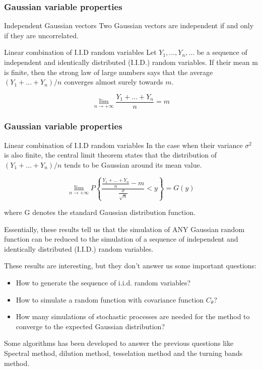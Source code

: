 \documentclass{beamer}
\begin{document}
\begin{frame}
\frametitle{Gaussian variable properties}

\begin{block}{Independent Gaussian vectors}
Two Gaussian vectors are independent if and only if they are uncorrelated.
\end{block}

\begin{block}{Linear combination of I.I.D random variables}
Let $Y_1, ..., Y_n, ...$ be a sequence of independent and identically distributed (I.I.D.) random variables. 
If their mean m is finite, then the strong law of large numbers says that the average 
$(Y_1 + ... + Y_n) / n$ converges almost surely towards $m$.

\begin{equation}
\lim_{n \to +\infty} \frac{Y_1 + ... + Y_n}{n} = m
\end{equation}
\end{block}

\end{frame}


\begin{frame}
 \frametitle{Gaussian variable properties}
 \begin{block}{Linear combination of I.I.D random variables}
  In the case when their variance $\sigma^2$ is also finite, the central limit theorem 
states that the distribution of $(Y_1 + … + Y_n) / n$ tends to be Gaussian around its mean value.

\begin{equation}
 \displaystyle \lim_{n \to +\infty} P \left \{ \frac{\frac{Y_1 + ... + Y_n}{n} - m}{\frac{\sigma}{\sqrt{n}}}  < y \right \} = G(y)
\end{equation}

where G denotes the standard Gaussian distribution function.

\end{block}
\end{frame}


\begin{frame}
Essentially, these results tell us that the simulation of ANY Gaussian random function can be reduced to
the simulation of a sequence of independent and  identically distributed (I.I.D.) random variables.


These results are interesting, but they don't answer us some important questions:
\begin{itemize}
 \item How to generate the sequence of i.i.d. random variables?
 \item How to simulate a random function with covariance function $C_\theta$?
 \item How many simulations of stochastic processes are needed for the method to converge to the expected Gaussian distribution?
\end{itemize}


Some algorithms has been developed to answer the previous questions like Spectral method, dilution method, tesselation method and 
the turning bands method.
\end{frame}
\end{document}
